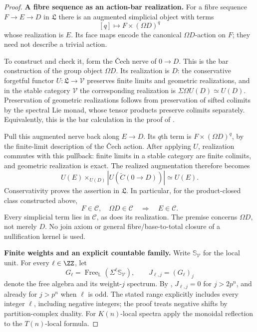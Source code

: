 \begin{proof}
\medskip\noindent
\textbf{A fibre sequence as an action-bar realization.}
For a fibre sequence $F\to E\to D$ in $\mathfrak L$ there is an
augmented simplicial object with terms
\[
 [q]\longmapsto F\times(\Omega D)^q
\]
whose realization is $E$. Its face maps encode the canonical
$\Omega D$-action on $F$; they need not describe a trivial action.

To construct and check it, form the \v{C}ech nerve of $0\to D$.
This is the bar construction of the group object $\Omega D$.
Its realization is $D$: the conservative forgetful functor
$U:\mathfrak L\to\mathcal V$ preserves finite limits and
geometric realizations, and in the stable category $\mathcal V$
the corresponding realization is
$\Sigma\Omega U(D)\simeq U(D)$.
Preservation of geometric realizations follows from preservation
of sifted colimits by the spectral Lie monad, whose tensor
products preserve colimits separately. Equivalently, this is
the bar calculation in the proof of
\cite[Proposition~4.11]{I_BlansHeuts2026}.

Pull this augmented nerve back along $E\to D$. Its $q$th term
is $F\times(\Omega D)^q$, by the finite-limit description of
the \v{C}ech action. After applying $U$, realization commutes
with this pullback: finite limits in a stable category are
finite colimits, and geometric realization is exact. The
realized augmentation therefore becomes
\[
 U(E)\mathop{\times}_{U(D)}
       |U(\check C(0\to D))|\simeq U(E).
\]
Conservativity proves the assertion in $\mathfrak L$. In
particular, for the product-closed class constructed above,
\[
 F\in\mathcal C,\quad \Omega D\in\mathcal C
 \quad\Longrightarrow\quad E\in\mathcal C.
 \tag{D.2.11d}
\]
Every simplicial term lies in $\mathcal C$, as does its
realization. The premise concerns $\Omega D$, not merely $D$.
No join axiom or general fibre/base-to-total closure of a
nullification kernel is used.

\medskip\noindent
\textbf{Finite weights and an explicit countable family.}
Write $\mathbb S_{\mathcal V}$ for the local unit. For every
$\ell\in\ZZ$, let
\[
 G_\ell=\operatorname{Free}_{\mathbb L}
                (\Sigma^\ell\mathbb S_{\mathcal V}),
 \qquad J_{\ell,j}=(G_\ell)_j
\]
denote the free algebra and its weight-$j$ spectrum. By
\cite[Theorem~4.22 and Corollary~4.23]{I_Heuts2021},
$J_{\ell,j}=0$ for $j>2p^n$, and already for $j>p^n$ when
$\ell$ is odd. The stated range explicitly includes every
integer $\ell$, including negative integers; the proof treats
negative shifts by partition-complex duality. For $K(n)$-local
spectra apply the monoidal reflection to the $T(n)$-local
formula.


\end{proof}
